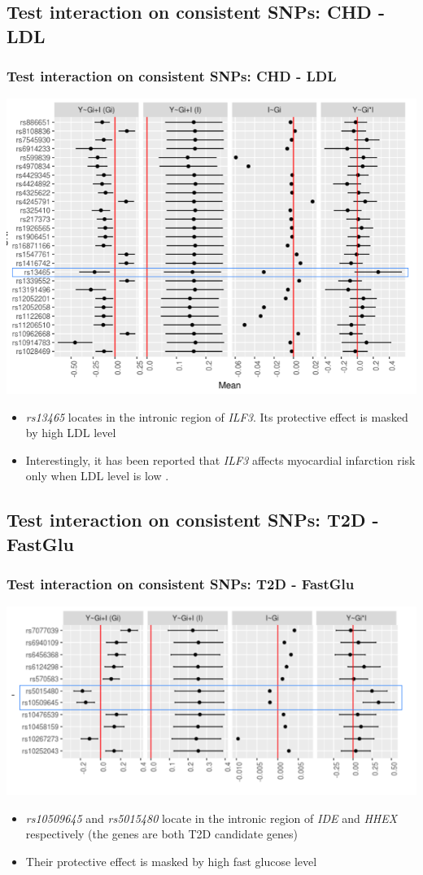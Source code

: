 \documentclass{beamer}
\begin{document}
  \subsection{Test interaction on consistent SNPs: CHD - LDL}
  \begin{frame}
  \frametitle{Test interaction on consistent SNPs: CHD - LDL}
    \centering
    \includegraphics[width=.8\linewidth]{ldl2}
    \label{fig:ldl2}
    \begin{itemize}
      \item \textit{rs13465} locates in the intronic region of \textit{ILF3}. Its protective effect is masked by high LDL level
      \item Interestingly, it has been reported that \textit{ILF3} affects myocardial infarction risk only when LDL level is low \cite{yoshida2011association}.
    \end{itemize}
  \end{frame}

  \subsection{Test interaction on consistent SNPs: T2D - FastGlu}
  \begin{frame}
  \frametitle{Test interaction on consistent SNPs: T2D - FastGlu}
    \centering
    \includegraphics[width=.8\linewidth]{glu2}
    \label{fig:glu2}
    \begin{itemize}
      \item \textit{rs10509645} and \textit{rs5015480} locate in the intronic region of \textit{IDE} and \textit{HHEX} respectively (the genes are both T2D candidate genes)
      \item Their protective effect is masked by high fast glucose level
    \end{itemize}
  \end{frame}
\end{document}
